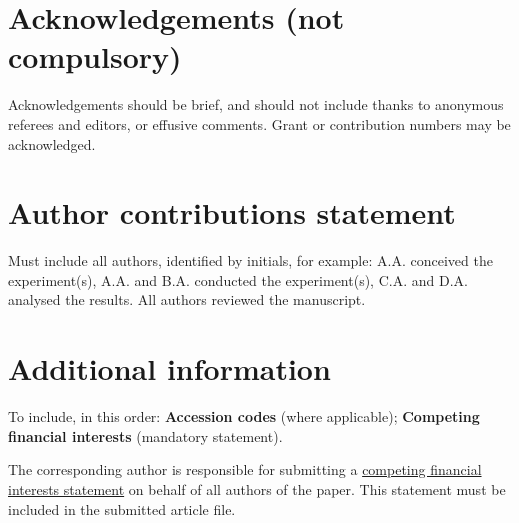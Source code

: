 \documentclass[12pt,oneside]{wlscirep}
\begin{document}
\nolinenumbers





\section*{Acknowledgements (not compulsory)}

Acknowledgements should be brief, and should not include thanks to anonymous referees and editors, or effusive comments. Grant or contribution numbers may be acknowledged.

\section*{Author contributions statement}

Must include all authors, identified by initials, for example:
A.A. conceived the experiment(s),  A.A. and B.A. conducted the experiment(s), C.A. and D.A. analysed the results.  All authors reviewed the manuscript. 

\section*{Additional information}

To include, in this order: \textbf{Accession codes} (where applicable); \textbf{Competing financial interests} (mandatory statement). 

The corresponding author is responsible for submitting a \href{http://www.nature.com/srep/policies/index.html#competing}{competing financial interests statement} on behalf of all authors of the paper. This statement must be included in the submitted article file.
\end{document}
